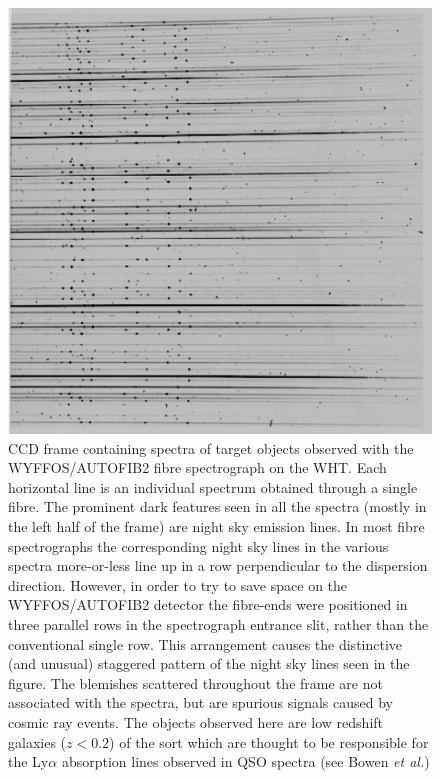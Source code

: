 \documentclass[chapters,twoside,11pt]{starlink}
\begin{document}
\begin{figure}[htbp]
   \centering
   \includegraphics[totalheight=5in]{sc14_objframe}
   \caption[CCD frame of target object spectra acquired with
    WYFFOS/AUTOFIB2]{CCD frame containing spectra of target objects
    observed with the WYFFOS/AUTOFIB2 fibre spectrograph on the WHT.
    Each horizontal line is an individual spectrum obtained through a
    single fibre.  The prominent dark features seen in all the spectra
    (mostly in the left half of the frame) are night sky emission lines.
    In most fibre spectrographs the corresponding night sky lines in the
    various spectra more-or-less line up in a row perpendicular to the
    dispersion direction.  However, in order to try to save space on the
    WYFFOS/AUTOFIB2 detector the fibre-ends were positioned in three
    parallel rows in the spectrograph entrance slit, rather than the
    conventional single row.  This arrangement causes the distinctive (and
    unusual) staggered pattern of the night sky lines seen in the figure.
    The blemishes scattered throughout the frame are not associated with
    the spectra, but are spurious signals caused by cosmic ray events.
    The objects observed here are low redshift galaxies ($z < 0.2$\/) of
    the sort which are thought to be responsible for the Ly$\alpha$
    absorption lines observed in QSO spectra (see Bowen \textit{et
    al.}\/\cite{BOWEN98})
   \label{OBJFRAME} }
\end{figure}
\end{document}
